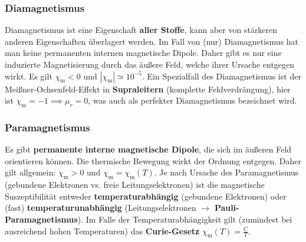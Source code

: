 		   \subsubsection{Diamagnetismus}
			         Diamagnetismus ist eine Eigenschaft \textbf{aller Stoffe}, kann aber von stärkeren anderen Eigenschaften überlagert werden. Im Fall von (nur) Diamagnetismus hat man keine permanenten internen magnetische Dipole. Daher gibt es nur eine induzierte Magnetisierung durch das äußere Feld, welche ihrer Ursache entgegen wirkt. Es gilt $\chi_\mathrm{m} < 0$ und $|\chi_\mathrm{m}| \simeq 10^{-5}$.
			         Ein Spezialfall des Diamagnetismus ist der Meißner-Ochsenfeld-Effekt in \textbf{Supraleitern} (komplette Feldverdrängung), hier ist
			              $\chi_\mathrm{m} = -1\implies \mu_r=0$, was auch als perfekter Diamagnetismus bezeichnet wird.
		  \subsubsection{Paramagnetismus}
			         Es gibt \textbf{permanente interne magnetische Dipole}, die sich im äußeren Feld orientieren können. Die thermische Bewegung wirkt der Ordnung entgegen. Daher gilt allgemein: $\chi_\mathrm{m} > 0 \text{ und } \chi_\mathrm{m} = \chi_\mathrm{m}(T)$. Je nach Ursache des Paramagnetismus (gebundene Elektronen vs. freie Leitungselektronen) ist die magnetische Suszeptibilität entweder \textbf{temperaturabhängig} (gebundene Elektronen) oder (fast) \textbf{temperaturunabhängig} (Leitungselektronen $\to$ \textbf{Pauli-Paramagnetismus}).
			         Im Falle der Temperaturabhängigkeit gilt (zumindest bei ausreichend hohen Temperaturen) das \textbf{Curie-Gesetz} $\chi_\mathrm{m}(T) = \frac{C}{T}$.

